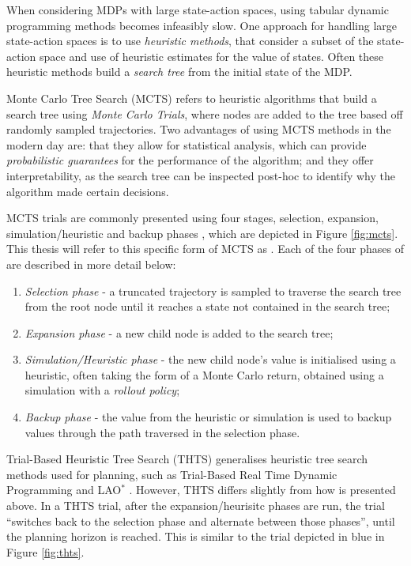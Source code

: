     When considering MDPs with large state-action spaces, using tabular dynamic programming methods becomes infeasibly slow. One approach for handling large state-action spaces is to use \textit{heuristic methods}, that consider a subset of the state-action space and use of heuristic estimates for the value of states. Often these heuristic methods build a \textit{search tree} from the initial state of the MDP.

    Monte Carlo Tree Search (MCTS) refers to heuristic algorithms that build a search tree using \textit{Monte Carlo Trials}, where nodes are added to the tree based off randomly sampled trajectories. Two advantages of using MCTS methods in the modern day are: that they allow for statistical analysis, which can provide \textit{probabilistic guarantees} for the performance of the algorithm; and they offer interpretability, as the search tree can be inspected post-hoc to identify why the algorithm made certain decisions.

    MCTS trials are commonly presented using four stages, selection, expansion, simulation/heuristic and backup phases \cite{mcts_survey}, which are depicted in Figure \ref{fig:mcts}. This thesis will refer to this specific form of MCTS as \mctsone. Each of the four phases of \mctsone are described in more detail below:
    \begin{enumerate}
        \item \textit{Selection phase} - a truncated trajectory is sampled to traverse the search tree from the root node until it reaches a state not contained in the search tree;
        \item \textit{Expansion phase} - a new child node is added to the search tree;
        \item \textit{Simulation/Heuristic phase} - the new child node's value is initialised using a heuristic, often taking the form of a Monte Carlo return, obtained using a simulation with a \textit{rollout policy}; 
        \item \textit{Backup phase} - the value from the heuristic or simulation is used to backup values through the path traversed in the selection phase.
    \end{enumerate}

    Trial-Based Heuristic Tree Search (THTS) \cite{thts} generalises heuristic tree search methods used for planning, such as Trial-Based Real Time Dynamic Programming \cite{rtdp} and LAO$^*$ \cite{lao_star}. However, THTS differs slightly from how \mctsone is presented above. In a THTS trial, after the expansion/heurisitc phases are run, the trial ``switches back to the selection phase and alternate between those phases'', until the planning horizon is reached. This is similar to the trial depicted in blue in Figure \ref{fig:thts}.

